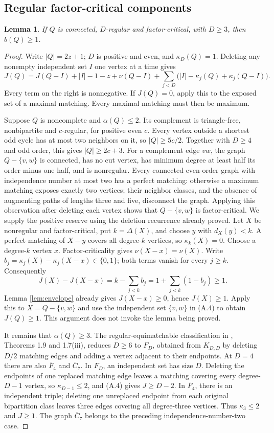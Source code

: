 \documentclass[11pt,a4paper]{article}
\newtheorem{lemma}[theorem]{Lemma}
\theoremstyle{definition}
\begin{document}
\subsection{Regular factor-critical components}
\begin{lemma}\label{lem:regular-reserve}
If $Q$ is connected, $D$-regular and factor-critical, with $D\ge3$, then $b(Q)\ge1$.
\end{lemma}
\begin{proof}
Write $|Q|=2z+1$; $D$ is positive and even, and $\kappa_D(Q)=1$. Deleting any nonempty independent set $I$ one vertex at a time gives
\[
J(Q)=J(Q-I)+|I|-1-z+\nu(Q-I)
 +\sum_{j<D}\bigl(|I|-\kappa_j(Q)+\kappa_j(Q-I)\bigr). \tag{A.4}
\]
Every term on the right is nonnegative. If $J(Q)=0$, apply this to the exposed set of a maximal matching. Every maximal matching must then be maximum.

Suppose $Q$ is noncomplete and $\alpha(Q)\le2$. Its complement is triangle-free, nonbipartite and $c$-regular, for positive even $c$. Every vertex outside a shortest odd cycle has at most two neighbors on it, so $|Q|\ge5c/2$. Together with $D\ge4$ and odd order, this gives $|Q|\ge2c+3$. For a complement edge $vw$, the graph $Q-\{v,w\}$ is connected, has no cut vertex, has minimum degree at least half its order minus one half, and is nonregular. Every connected even-order graph with independence number at most two has a perfect matching: otherwise a maximum matching exposes exactly two vertices; their neighbor classes, and the absence of augmenting paths of lengths three and five, disconnect the graph. Applying this observation after deleting each vertex shows that $Q-\{v,w\}$ is factor-critical. We supply the positive reserve using the deletion recurrence already proved. Let $X$ be nonregular and factor-critical, put $k=\Delta(X)$, and choose $y$ with $d_X(y)<k$. A perfect matching of $X-y$ covers all degree-$k$ vertices, so $\kappa_k(X)=0$. Choose a degree-$k$ vertex $x$. Factor-criticality gives $\nu(X-x)=\nu(X)$. Write $b_j=\kappa_j(X)-\kappa_j(X-x)\in\{0,1\}$; both terms vanish for every $j\ge k$. Consequently
\[
J(X)-J(X-x)=k-\sum_{j<k}b_j
=1+\sum_{j<k}(1-b_j)\ge1.
\]
Lemma \ref{lem:envelope} already gives $J(X-x)\ge0$, hence $J(X)\ge1$. Apply this to $X=Q-\{v,w\}$ and use the independent set $\{v,w\}$ in (A.4) to obtain $J(Q)\ge1$. This argument does not invoke the lemma being proved.

It remains that $\alpha(Q)\ge3$. The regular-equimatchable classification in \cite{zhao}, Theorems 1.9 and 1.7(iii), reduces $D\ge6$ to $F_D$, obtained from $K_{D,D}$ by deleting $D/2$ matching edges and adding a vertex adjacent to their endpoints. At $D=4$ there are also $\overline F_4$ and $\overline C_7$. In $F_D$, an independent set has size $D$. Deleting the endpoints of one replaced matching edge leaves a matching covering every degree-$D-1$ vertex, so $\kappa_{D-1}\le2$, and (A.4) gives $J\ge D-2$. In $\overline F_4$, there is an independent triple; deleting one unreplaced endpoint from each original bipartition class leaves three edges covering all degree-three vertices. Thus $\kappa_3\le2$ and $J\ge1$. The graph $\overline C_7$ belongs to the preceding independence-number-two case.


\end{proof}
\end{document}

